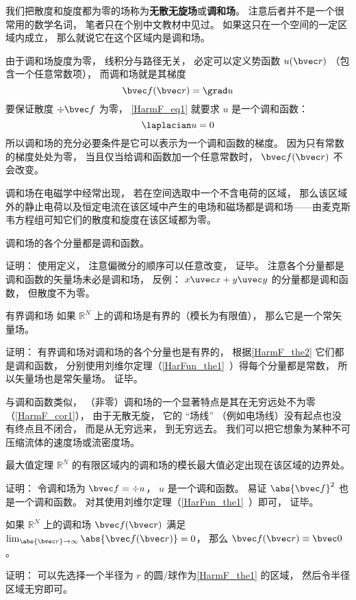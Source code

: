 


我们把散度和旋度都为零的场称为\textbf{无散无旋场}或\textbf{调和场}。 注意后者并不是一个很常用的数学名词， 笔者只在个别中文教材中见过。 如果这只在一个空间的一定区域内成立， 那么就说它在这个区域内是调和场。

由于调和场旋度为零， 线积分与路径无关， 必定可以定义势函数 $u(\bvec r)$ （包含一个任意常数项）， 而调和场就是其梯度
\begin{equation}\label{HarmF_eq1}
\bvec f(\bvec r) = \grad u
\end{equation}
要保证散度 $\div \bvec f$ 为零， \autoref{HarmF_eq1} 就要求 $u$ 是一个调和函数：
\begin{equation}
\laplacian u = 0
\end{equation}
所以调和场的充分必要条件是它可以表示为一个调和函数的梯度。 因为只有常数的梯度处处为零， 当且仅当给调和函数加一个任意常数时， $\bvec f(\bvec r)$ 不会改变。

调和场在电磁学中经常出现， 若在空间选取中一个不含电荷的区域， 那么该区域外的静止电荷以及恒定电流在该区域中产生的电场和磁场都是调和场——由麦克斯韦方程组可知它们的散度和旋度在该区域都为零。

\begin{theorem}{}\label{HarmF_the2}
调和场的各个分量都是调和函数。
\end{theorem}
证明： 使用定义， 注意偏微分的顺序可以任意改变， 证毕。 注意各个分量都是调和函数的矢量场未必是调和场， 反例： $x\uvec x + y \uvec y$ 的分量都是调和函数， 但散度不为零。

\begin{corollary}{有界调和场}
如果 $\mathbb R^N$ 上的调和场是有界的（模长为有限值）， 那么它是一个常矢量场。
\end{corollary}
证明： 有界调和场对调和场的各个分量也是有界的， 根据\autoref{HarmF_the2} 它们都是调和函数， 分别使用刘维尔定理（\autoref{HarFun_the1}~）得每个分量都是常数， 所以矢量场也是常矢量场。 证毕。

与调和函数类似， （非零）调和场的一个显著特点是其在无穷远处不为零（\autoref{HarmF_cor1}）， 由于无散无旋， 它的 “场线” （例如电场线）没有起点也没有终点且不闭合， 而是从无穷远来， 到无穷远去。 我们可以把它想象为某种不可压缩流体的速度场或流密度场。

\begin{theorem}{最大值定理}\label{HarmF_the1}
$\mathbb R^N$ 的有限区域内的调和场的模长最大值必定出现在该区域的边界处。
\end{theorem}
证明： 令调和场为 $\bvec f = \div u$， $u$ 是一个调和函数。 易证 $\abs{\bvec f}^2$ 也是一个调和函数。 对其使用刘维尔定理（\autoref{HarFun_the1}~）即可， 证毕。

\begin{corollary}{}\label{HarmF_cor1}
如果 $\mathbb R^N$ 上的调和场 $\bvec f(\bvec r)$ 满足 $\lim_{\abs{\bvec r}\to \infty} \abs{\bvec f(\bvec r)}  = 0$， 那么 $\bvec f(\bvec r) \equiv \bvec 0$。
\end{corollary}
证明： 可以先选择一个半径为 $r$ 的圆/球作为\autoref{HarmF_the1} 的区域， 然后令半径区域无穷即可。

